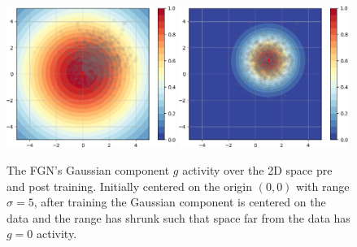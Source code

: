 \documentclass[12pt,oneside]{CUNY_PhD}
\begin{document}
\begin{figure}[!htbp]
    \centering
    \includegraphics[width=0.49\textwidth ]{images/2D-single-neuron/2d-easy-initialg-cropped.png}
    \includegraphics[width=0.49\textwidth]{images/2D-single-neuron/2d-easy-trainedg-cropped.png}
    \caption{The FGN's Gaussian component $g$ activity over the 2D space pre and post training. Initially centered on the origin $(0,0)$ with range $\sigma=5$, after training the Gaussian component is centered on the data and the range has shrunk such that space far from the data has $g=0$ activity.}
    \label{fig:single-fgn-2}
\end{figure}\\
\end{document}
